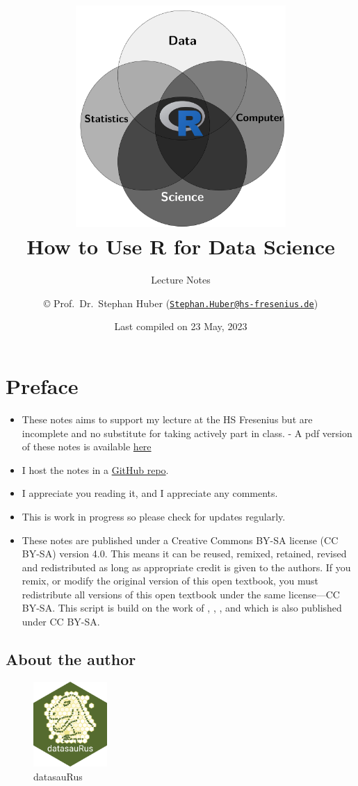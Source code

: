 \documentclass[
  12pt,
  oneside]{book}
\title{\includegraphics[width=8cm,height=\textheight]{fig/cover.png}\\
How to Use R for Data Science}
\subtitle{Lecture Notes}
\author{© Prof.~Dr.~Stephan Huber (\href{mailto:Stephan.Huber@hs-fresenius.de}{\nolinkurl{Stephan.Huber@hs-fresenius.de}})}
\date{Last compiled on 23 May, 2023}
\providecommand{\tightlist}{%
  \setlength{\itemsep}{0pt}\setlength{\parskip}{0pt}}
\theoremstyle{definition}
\theoremstyle{definition}
\theoremstyle{definition}
\theoremstyle{definition}
\theoremstyle{remark}
\begin{document}
\maketitle

{
\hypersetup{linkcolor=}
\setcounter{tocdepth}{2}
\tableofcontents
}
\hypertarget{preface}{%
\chapter*{Preface}\label{preface}}

\begin{itemize}
\tightlist
\item
  These notes aims to support my lecture at the HS Fresenius but are incomplete and no substitute for taking actively part in class. - A pdf version of these notes is available \href{https://raw.githubusercontent.com/hubchev/hubchev.github.io/main/ds/_main.pdf}{here}
\item
  I host the notes in a \href{https://github.com/hubchev/hubchev.github.io/tree/main/ds}{GitHub repo}.
\item
  I appreciate you reading it, and I appreciate any comments.
\item
  This is work in progress so please check for updates regularly.
\item
  These notes are published under a Creative Commons BY-SA license (CC BY-SA) version 4.0. This means it can be reused, remixed, retained, revised and redistributed as long as appropriate credit is given to the authors. If you remix, or modify the original version of this open textbook, you must redistribute all versions of this open textbook under the same license---CC BY-SA. This script is build on the work of \citet{Navarro2020Learning}, \citet{Muschelli2022Introduction}, \citet{Thulin2021Modern}, and \citet{Ismay2022Statistical} which is also published under CC BY-SA.
\end{itemize}

\hypertarget{about-the-author}{%
\section*{About the author}\label{about-the-author}}

\begin{figure}
\centering
\includegraphics[width=0.25\textwidth,height=\textheight]{fig/datasaurus.png}
\caption[\label{fig:datasaurus} datasauRus]{\label{fig:datasaurus} datasauRus\footnotemark{}}
\end{figure}
\end{document}
